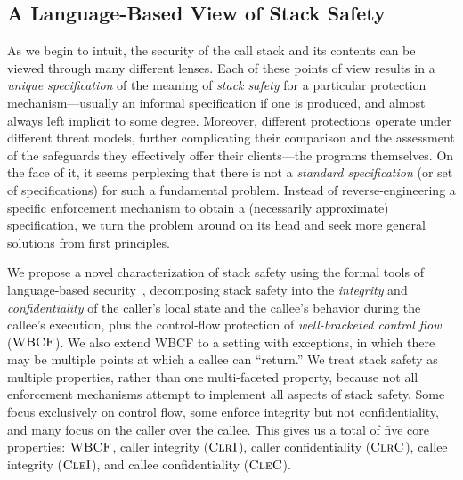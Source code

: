 \subsection{A Language-Based View of Stack Safety}

As we begin to intuit, the security of the call stack and its contents can be
viewed through many different lenses. Each of these points of view results in a
\emph{unique specification} of the meaning of \emph{stack safety} for a
particular protection mechanism---usually an informal specification if one is
produced, and almost always left implicit to some degree.
%
Moreover, different protections operate under different threat models, further
complicating their comparison and the assessment of the safeguards they
effectively offer their clients---the programs themselves.
%
On the face of it, it seems perplexing that there is not a \emph{standard
specification} (or set of specifications) for such a fundamental problem.
Instead of reverse-engineering a specific enforcement mechanism to obtain a
(necessarily approximate) specification, we turn the problem around on its head
and seek more general solutions from first principles.
%


We propose a novel characterization of stack safety using the formal tools of language-based
security~\cite{sabelfeld2003language}, decomposing stack safety into
the {\em integrity} and {\em confidentiality} of the caller’s local state
and the callee's behavior during the callee's execution, plus the control-flow protection
of {\em well-bracketed control flow}~\cite{SkorstengaardSTKJFP} (\(\textnormal{\sc WBCF}\)).
\ifexceptions
We also extend WBCF to a setting with exceptions,
in which there may be multiple points at which a callee can ``return.''
\fi
%
We treat stack safety as multiple properties, rather than one multi-faceted property, because
not all enforcement mechanisms attempt to implement all aspects of stack safety. Some focus
exclusively on control flow, some enforce integrity but not confidentiality, and many
focus on the caller over the callee.
%
%
This gives us a total of five core properties: \(\textnormal{\sc WBCF}\),
caller integrity (\(\textnormal{\sc ClrI}\)), caller confidentiality (\(\textnormal{\sc ClrC}\)),
callee integrity (\(\textnormal{\sc CleI}\)), and callee confidentiality (\(\textnormal{\sc CleC}\)).
%

